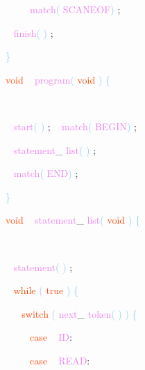 \documentclass[8, usernames, dvipsnames]{beamer}
\begin{document}
\begin{frame}
\textcolor{White}{\   }
\textcolor{White}{\   }
\textcolor{White}{\   }
\textcolor{Violet}{match}\textcolor{SkyBlue}{(}
\textcolor{Violet}{SCANEOF}\textcolor{SkyBlue}{)}
\textcolor{Sepia}{;}

 \textcolor{White}{\   }
\textcolor{Violet}{finish}\textcolor{SkyBlue}{(}
\textcolor{SkyBlue}{)}
\textcolor{Sepia}{;}

 
 \textcolor{SkyBlue}{\} }

 
 \textcolor{OrangeRed}{void}
\textcolor{White}{\ }
\textcolor{Violet}{program}\textcolor{SkyBlue}{(}
\textcolor{OrangeRed}{void}
\textcolor{SkyBlue}{)}
\textcolor{SkyBlue}{\{ }

 \textcolor{White}{\   }

 \textcolor{White}{\   }
\textcolor{Violet}{start}\textcolor{SkyBlue}{(}
\textcolor{SkyBlue}{)}
\textcolor{Sepia}{;}
\textcolor{White}{\   }
\textcolor{Violet}{match}\textcolor{SkyBlue}{(}
\textcolor{Violet}{BEGIN}\textcolor{SkyBlue}{)}
\textcolor{Sepia}{;}

 \textcolor{White}{\   }
\textcolor{Violet}{statement}\textcolor{Sepia}{\_}
\textcolor{Violet}{list}\textcolor{SkyBlue}{(}
\textcolor{SkyBlue}{)}
\textcolor{Sepia}{;}

 \textcolor{White}{\   }
\textcolor{Violet}{match}\textcolor{SkyBlue}{(}
\textcolor{Violet}{END}\textcolor{SkyBlue}{)}
\textcolor{Sepia}{;}

 \end{frame}
\begin{frame}
\textcolor{SkyBlue}{\} }

 
 
 \textcolor{OrangeRed}{void}
\textcolor{White}{\ }
\textcolor{Violet}{statement}\textcolor{Sepia}{\_}
\textcolor{Violet}{list}\textcolor{SkyBlue}{(}
\textcolor{OrangeRed}{void}
\textcolor{SkyBlue}{)}
\textcolor{SkyBlue}{\{ }

 \textcolor{White}{\   }

 \textcolor{White}{\   }
\textcolor{Violet}{statement}\textcolor{SkyBlue}{(}
\textcolor{SkyBlue}{)}
\textcolor{Sepia}{;}

 \textcolor{White}{\   }
\textcolor{OrangeRed}{while}
\textcolor{SkyBlue}{(}
\textcolor{OrangeRed}{true}
\textcolor{SkyBlue}{)}
\textcolor{SkyBlue}{\{ }

 \textcolor{White}{\   }
\textcolor{White}{\   }
\textcolor{OrangeRed}{switch}
\textcolor{SkyBlue}{(}
\textcolor{Violet}{next}\textcolor{Sepia}{\_}
\textcolor{Violet}{token}\textcolor{SkyBlue}{(}
\textcolor{SkyBlue}{)}
\textcolor{SkyBlue}{)}
\textcolor{SkyBlue}{\{ }

 \textcolor{White}{\   }
\textcolor{White}{\   }
\textcolor{White}{\   }
\textcolor{OrangeRed}{case}
\textcolor{White}{\ }
\textcolor{Violet}{ID}\textcolor{Sepia}{:}

 \textcolor{White}{\   }
\textcolor{White}{\   }
\textcolor{White}{\   }
\textcolor{OrangeRed}{case}
\textcolor{White}{\ }
\textcolor{Violet}{READ}\textcolor{Sepia}{:}

 \end{frame}
\end{document}
